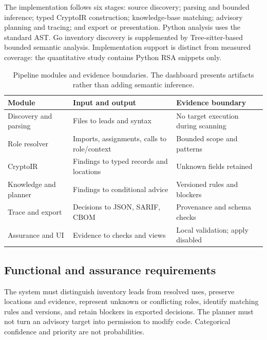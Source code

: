 \documentclass[conference,a4paper]{IEEEtran}
\begin{document}
The implementation follows six stages: source discovery; parsing and bounded inference; typed CryptoIR construction; knowledge-base matching; advisory planning and tracing; and export or presentation. Python analysis uses the standard AST. Go inventory discovery is supplemented by Tree-sitter-based bounded semantic analysis. Implementation support is distinct from measured coverage: the quantitative study contains Python RSA snippets only.

\begin{table}[!t]
\caption{Pipeline modules and evidence boundaries. The dashboard presents artifacts rather than adding semantic inference.}
\centering\scriptsize
\setlength{\tabcolsep}{2pt}
\begin{tabular}{@{}>{\raggedright\arraybackslash}p{}>{\raggedright\arraybackslash}p{}>{\raggedright\arraybackslash}p{}@{}}
\toprule
Module & Input and output & Evidence boundary \\
\midrule
Discovery and parsing & Files to leads and syntax & No target execution during scanning \\
Role resolver & Imports, assignments, calls to role/context & Bounded scope and patterns \\
CryptoIR & Findings to typed records and locations & Unknown fields retained \\
Knowledge and planner & Findings to conditional advice & Versioned rules and blockers \\
Trace and export & Decisions to JSON, SARIF, CBOM & Provenance and schema checks \\
Assurance and UI & Evidence to checks and views & Local validation; apply disabled \\
\bottomrule
\end{tabular}
\end{table}

\subsection{Functional and assurance requirements}

The system must distinguish inventory leads from resolved uses, preserve locations and evidence, represent unknown or conflicting roles, identify matching rules and versions, and retain blockers in exported decisions. The planner must not turn an advisory target into permission to modify code. Categorical confidence and priority are not probabilities.
\end{document}
